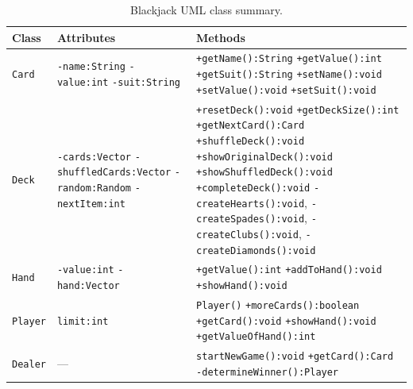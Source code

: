\documentclass[11pt, a4paper, notitlepage]{report}
\theoremstyle{definition}
\theoremstyle{remark}
\theoremstyle{definition}
\begin{document}
\begin{table}[h]
\centering
\renewcommand{\arraystretch}{1.35}
\begin{tabular}{@{}p{2cm}p{4.5cm}p{6cm}@{}}
\toprule
\textbf{Class} & \textbf{Attributes} & \textbf{Methods} \\
\midrule
\texttt{Card}
  & \texttt{-name:String} \newline
    \texttt{-value:int} \newline
    \texttt{-suit:String}
  & \texttt{+getName():String} \newline
    \texttt{+getValue():int} \newline
    \texttt{+getSuit():String} \newline
    \texttt{+setName():void} \newline
    \texttt{+setValue():void} \newline
    \texttt{+setSuit():void} \\[2pt]
\midrule
\texttt{Deck}
  & \texttt{-cards:Vector} \newline
    \texttt{-shuffledCards:Vector} \newline
    \texttt{-random:Random} \newline
    \texttt{-nextItem:int}
  & \texttt{+resetDeck():void} \newline
    \texttt{+getDeckSize():int} \newline
    \texttt{+getNextCard():Card} \newline
    \texttt{+shuffleDeck():void} \newline
    \texttt{+showOriginalDeck():void} \newline
    \texttt{+showShuffledDeck():void} \newline
    \texttt{+completeDeck():void} \newline
    \texttt{-createHearts():void},
    \texttt{-createSpades():void},
    \texttt{-createClubs():void},
    \texttt{-createDiamonds():void} \\[2pt]
\midrule
\texttt{Hand}
  & \texttt{-value:int} \newline
    \texttt{-hand:Vector}
  & \texttt{+getValue():int} \newline
    \texttt{+addToHand():void} \newline
    \texttt{+showHand():void} \\[2pt]
\midrule
\texttt{Player}
  & \texttt{limit:int}
  & \texttt{Player()} \newline
    \texttt{+moreCards():boolean} \newline
    \texttt{+getCard():void} \newline
    \texttt{+showHand():void} \newline
    \texttt{+getValueOfHand():int} \\[2pt]
\midrule
\texttt{Dealer}
  & ---
  & \texttt{startNewGame():void} \newline
    \texttt{+getCard():Card} \newline
    \texttt{-determineWinner():Player} \\
\bottomrule
\end{tabular}
\caption{Blackjack UML class summary.}
\label{tab:ch8-uml}
\end{table}
\end{document}
